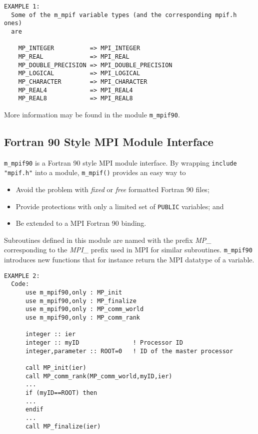 \begin{verbatim}
EXAMPLE 1:
  Some of the m_mpif variable types (and the corresponding mpif.h ones)
  are

    MP_INTEGER          => MPI_INTEGER
    MP_REAL             => MPI_REAL
    MP_DOUBLE_PRECISION => MPI_DOUBLE_PRECISION
    MP_LOGICAL          => MPI_LOGICAL
    MP_CHARACTER        => MPI_CHARACTER
    MP_REAL4            => MPI_REAL4
    MP_REAL8            => MPI_REAL8
\end{verbatim}

More information may be found in the module \verb"m_mpif90".

\subsection{Fortran 90 Style MPI Module Interface}
{\tt m\_mpif90} is a Fortran 90 style MPI module interface.
By wrapping \verb'include "mpif.h"' into a module, \verb"m_mpif()"
provides an easy way to
%
\begin{itemize}
\item Avoid the problem with {\sl fixed} or {\sl free} formatted
      Fortran 90 files;
\item Provide protections with only a limited set of \verb"PUBLIC"
      variables; and
\item Be extended to a MPI Fortran 90 binding.
\end{itemize}
%
Subroutines defined in this module are named with the prefix
{\sl MP\_} corresponding to the {\sl MPI\_} prefix used in MPI
for similar subroutines.
{\tt m\_mpif90} introduces new functions that for instance return
the MPI datatype of a variable.
%
\begin{verbatim}
EXAMPLE 2:
  Code:
      use m_mpif90,only : MP_init
      use m_mpif90,only : MP_finalize
      use m_mpif90,only : MP_comm_world
      use m_mpif90,only : MP_comm_rank

      integer :: ier
      integer :: myID               ! Processor ID
      integer,parameter :: ROOT=0   ! ID of the master processor
      
      call MP_init(ier)
      call MP_comm_rank(MP_comm_world,myID,ier)
      ...
      if (myID==ROOT) then
      ...
      endif
      ...
      call MP_finalize(ier)
\end{verbatim}
%
